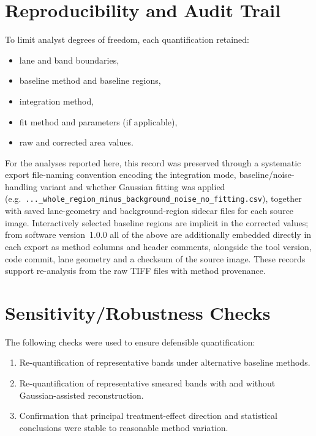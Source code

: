 \section{Reproducibility and Audit Trail}

To limit analyst degrees of freedom, each quantification retained:
\begin{itemize}
    \item lane and band boundaries,
    \item baseline method and baseline regions,
    \item integration method,
    \item fit method and parameters (if applicable),
    \item raw and corrected area values.
\end{itemize}

For the analyses reported here, this record was preserved through a systematic export file-naming convention encoding the integration mode, baseline/noise-handling variant and whether Gaussian fitting was applied (e.g.\ \texttt{...\_whole\_region\_minus\_background\_noise\_no\_fitting.csv}), together with saved lane-geometry and background-region sidecar files for each source image. Interactively selected baseline regions are implicit in the corrected values; from software version~1.0.0 all of the above are additionally embedded directly in each export as method columns and header comments, alongside the tool version, code commit, lane geometry and a checksum of the source image. These records support re-analysis from the raw TIFF files with method provenance.

\section{Sensitivity/Robustness Checks}

The following checks were used to ensure defensible quantification:
\begin{enumerate}
    \item Re-quantification of representative bands under alternative baseline methods.
    \item Re-quantification of representative smeared bands with and without Gaussian-assisted reconstruction.
    \item Confirmation that principal treatment-effect direction and statistical conclusions were stable to reasonable method variation.
\end{enumerate}

